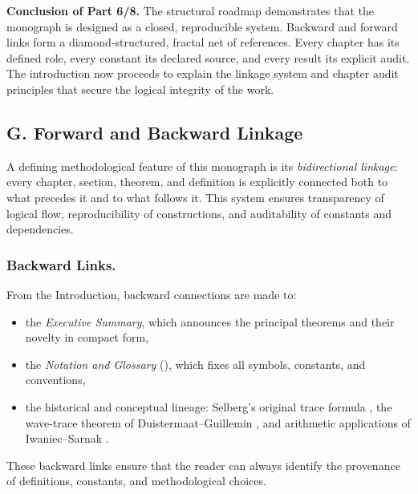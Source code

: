 \medskip

\noindent\textbf{Conclusion of Part 6/8.}
The structural roadmap demonstrates that the monograph is designed as a closed, reproducible system.
Backward and forward links form a diamond-structured, fractal net of references.
Every chapter has its defined role,
every constant its declared source,
and every result its explicit audit.
The introduction now proceeds to explain the linkage system and chapter audit principles
that secure the logical integrity of the work.


\subsection*{G. Forward and Backward Linkage}

A defining methodological feature of this monograph is its \emph{bidirectional linkage}:
every chapter, section, theorem, and definition is explicitly connected both to what precedes it
and to what follows it. This system ensures transparency of logical flow,
reproducibility of constructions, and auditability of constants and dependencies.

\subsubsection*{Backward Links.}
From the Introduction, backward connections are made to:
\begin{itemize}
  \item the \emph{Executive Summary}, which announces the principal theorems and their novelty in compact form,
  \item the \emph{Notation and Glossary} (), which fixes all symbols, constants, and conventions,
  \item the historical and conceptual lineage: Selberg’s original trace formula \cite{Selberg1956},
        the wave-trace theorem of Duistermaat–Guillemin \cite{DG1975}, and
        arithmetic applications of Iwaniec–Sarnak \cite{Iwaniec2002}.
\end{itemize}
These backward links ensure that the reader can always identify the provenance of definitions,
constants, and methodological choices.


